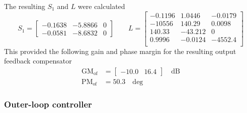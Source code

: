 The resulting $S_{1}$ and $L$ were calculated
\begin{equation*}
  S_{1} =
  \begin{bmatrix}
    -0.1638 & -5.8866 & 0 \\
    -0.0581 & -8.6832 & 0
  \end{bmatrix}
  \qquad
  L =
  \begin{bmatrix}
    -0.1196 & 1.0446 & -0.0179 \\
    -10556 & 140.29 & 0.0098 \\
    140.33 & -43.212 & 0 \\
    0.9996 & -0.0124 & -4552.4 \\
  \end{bmatrix}
\end{equation*}
This provided the following gain and phase margin for the resulting output feedback compensator
\begin{align*}
  \text{GM}_{\text{of}} &=
  \begin{bmatrix}
    -10.0 & 16.4
  \end{bmatrix}
  \quad \text{dB}\\
  \text{PM}_{\text{of}} &=
  50.3
  \quad \text{deg}
\end{align*}

\subsubsection{Outer-loop controller}

